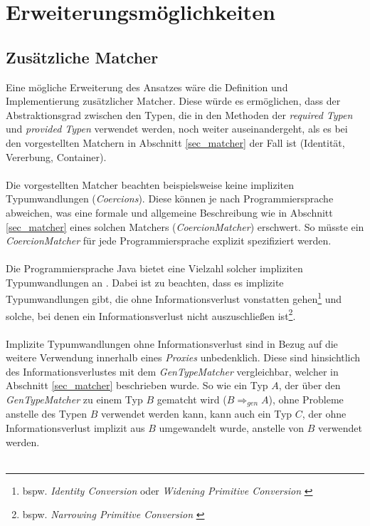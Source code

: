 \section{Erweiterungsmöglichkeiten}
\subsection{Zusätzliche Matcher}
Eine mögliche Erweiterung des Ansatzes wäre die Definition und Implementierung zusätzlicher Matcher. Diese würde es ermöglichen, dass der Abstraktionsgrad zwischen den Typen, die in den Methoden der \emph{required Typen} und \emph{provided Typen} verwendet werden, noch weiter auseinandergeht, als es bei den vorgestellten Matchern in Abschnitt \ref{sec_matcher} der Fall ist (Identität, Vererbung, Container).
\\\\
Die vorgestellten Matcher beachten beispielsweise keine impliziten Typumwandlungen (\emph{Coercions}). Diese können je nach Programmiersprache abweichen, was eine formale und allgemeine Beschreibung wie in Abschnitt \ref{sec_matcher} eines solchen Matchers (\emph{CoercionMatcher}) erschwert. So müsste ein \emph{CoercionMatcher} für jede Programmiersprache explizit spezifiziert werden.
\\\\
Die Programmiersprache Java bietet eine Vielzahl solcher impliziten Typumwandlungen an \cite{conversions_and_promotions}. Dabei ist zu beachten, dass es implizite Typumwandlungen gibt, die ohne Informationsverlust vonstatten gehen\footnote{bspw. \emph{Identity Conversion} oder \emph{Widening Primitive Conversion} \cite{conversions_and_promotions}} und solche, bei denen ein Informationsverlust nicht auszuschließen ist\footnote{bspw. \emph{Narrowing Primitive Conversion} \cite{conversions_and_promotions}}. 
\\\\
Implizite Typumwandlungen ohne Informationsverlust sind in Bezug auf die weitere Verwendung innerhalb eines \emph{Proxies} unbedenklich. Diese sind hinsichtlich des Informationsverlustes mit dem \emph{GenTypeMatcher} vergleichbar, welcher in Abschnitt \ref{sec_matcher} beschrieben wurde. So wie ein Typ $A$, der über den \emph{GenTypeMatcher} zu einem Typ $B$ gematcht wird ($B \Rightarrow_{gen} A$), ohne Probleme anstelle des Typen $B$ verwendet werden kann, kann auch ein Typ $C$, der ohne Informationsverlust implizit aus $B$ umgewandelt wurde, anstelle von $B$ verwendet werden.
\\\\
